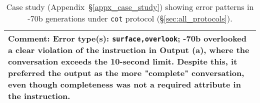 \begin{table*}[ht]
\begin{tabular}{p{24.5em}c}
    \multicolumn{2}{p{50em}}{\textbf{Comment:} Error type(s):  \texttt{surface,overlook}; \llama-3-70b overlooked a clear violation of the instruction in Output (a), where the conversation exceeds the 10-second limit. Despite this, it preferred the output as the more "complete" conversation, even though completeness was not a required attribute in the instruction.} \\
    \bottomrule
    \end{tabular}%
  \caption{Case study (Appendix~\S\ref{appx_case_study}) showing error patterns in -70b generations under \texttt{cot} protocol (\S\ref{sec:all_protocols}).}
  \label{tab:appx_error_case}
\end{table*}

\clearpage